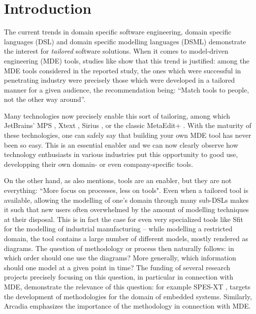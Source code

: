 \section{Introduction}
\label{sec:intro}
\vspace{-.3cm}
The current trends in domain specific software engineering, domain specific
languages (DSL) and domain specific modelling languages (DSML) demonstrate the
interest for \emph{tailored} software solutions.
When it comes to model-driven engineering (MDE) tools, studies like \cite{DBLP:conf/models/WhittleHRBH13} 
show that this trend is justified: among the MDE tools considered
in the reported study, the ones which were successful in penetrating industry
were precisely those which were developed in a tailored manner for a given
audience, the recommendation being: ``Match tools to people, not the other way
around''.

Many technologies now precisely enable this sort of tailoring, among which 
JetBrains' MPS \cite{DBLP:conf/pppj/PechSV13},
Xtext \cite{DBLP:conf/oopsla/EysholdtB10},
Sirius \cite{DBLP:conf/asplos/HauswaldLZLRKDM15}, or the classic MetaEdit+ \cite{DBLP:conf/sle/Tolvanen16}.
With the maturity of these technologies, one can safely say that building your own MDE tool
has never been so easy.
This is an essential enabler and we can now clearly observe how technology
enthusiasts in various industries put this opportunity to good use, developping their own domain- or even company-specific tools.

On the other hand, as \cite{DBLP:conf/models/WhittleHRBH13} also mentions, tools are an enabler,
but they are not everything: ``More focus on processes, less on tools".
Even when a tailored tool is available, allowing the modelling of one's domain through
many sub-DSLs makes it such that new users often overwhelmed by the amount
of modelling techniques at their disposal. This is in fact the case for even
very specialized tools like Sfit \cite{DBLP:conf/vamos/BayhaLAMI16} for the
modelling of industrial manufacturing -- while modelling a restricted domain,
the tool contains a large number of different models, mostly rendered as
diagrams.
The question of methodology or process then naturally follows: in which order
should one use the diagrams? More generally, which information should one model
at a given point in time? The funding of several research projects precisely
focusing on this question, in particular in connection with MDE, demonstrate the relevance of this
question: for example SPES-XT \cite{DBLP:books/sp/spes2016},
targets the development of methodologies for the domain of embedded systems.
Similarly, Arcadia \cite{DBLP:conf/syscon/BonnetVEN16} emphasizes the importance
of the methodology in connection with MDE.

